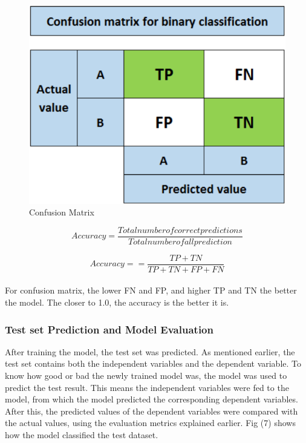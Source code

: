 \documentclass[conference]{IEEEtran}
\begin{document}
\begin{figure}[h]
    \centering
    \includegraphics[scale=0.57]{figs/confusionMatrix.png}
    \caption{Confusion Matrix}
    \label{dabc}        
\end{figure}

\begin{equation} 
\label{equ4}
Accuracy = \frac{Totalnumberofcorrectpredictions}{Totalnumberofallprediction}
\end{equation}

\begin{equation} 
\label{equ5}
Accuracy = = \frac{TP + TN}{TP + TN + FP + FN}
\end{equation}
\\
For confusion matrix, the lower FN and FP, and higher TP and TN the better the model. The closer to 1.0, the accuracy is the better it is.\\

\subsubsection{Test set Prediction and Model Evaluation}
After training the model, the test set was predicted. As mentioned earlier, the test set contains both the independent variables and the dependent variable. To know how good or bad the newly trained model was, the model was used to predict the test result. This means the independent variables were fed to the model, from which the model predicted the corresponding dependent variables.
After this, the predicted values of the dependent variables were compared with the actual values, using the evaluation metrics explained earlier. Fig (7) shows
how the model classified the test dataset.
\end{document}
